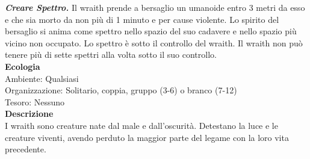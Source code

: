 \begin{multicols}{2}
\emph{\textbf{Creare Spettro.}} Il wraith prende a bersaglio un umanoide entro 3 metri da esso e che sia morto da non più di 1 minuto e per cause violente. Lo spirito del bersaglio si anima come spettro nello spazio del suo cadavere e nello spazio più vicino non occupato. Lo spettro è sotto il controllo del wraith. Il wraith non può tenere più di sette spettri alla volta sotto il suo controllo.\\
\textbf{Ecologia}\\
Ambiente: Qualsiasi\\
Organizzazione: Solitario, coppia, gruppo (3-6) o branco (7-12)\\
Tesoro: Nessuno\\
\textbf{Descrizione}\\
I wraith sono creature nate dal male e dall'oscurità. Detestano la luce e le creature viventi, avendo perduto la maggior parte del legame con la loro vita precedente.\\


\end{multicols}
